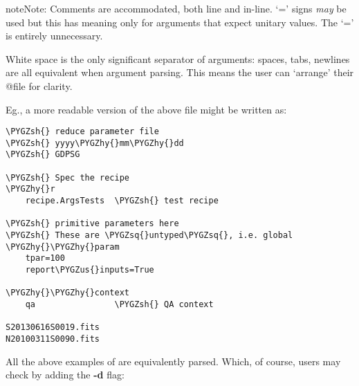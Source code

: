 \documentclass[letterpaper,10pt,english]{sphinxmanual}
\def\PYGZus{\char`\_}
\def\PYGZsh{\char`\#}
\def\PYGZhy{\char`\-}
\def\PYGZsq{\char`\'}
\begin{document}
\begin{notice}{note}{Note:}
Comments are accommodated, both line and in-line. `=' signs \emph{may} be
used but this has meaning only for arguments that expect unitary
values. The `=' is entirely unnecessary.

White space is the only significant separator of arguments: spaces,
tabs, newlines are all equivalent when argument parsing. This means
the user can `arrange' their @file for clarity.

Eg., a more readable version of the above file might be written as:

\begin{Verbatim}[commandchars=\\\{\}]
\PYGZsh{} reduce parameter file
\PYGZsh{} yyyy\PYGZhy{}mm\PYGZhy{}dd
\PYGZsh{} GDPSG

\PYGZsh{} Spec the recipe
\PYGZhy{}r
    recipe.ArgsTests  \PYGZsh{} test recipe

\PYGZsh{} primitive parameters here
\PYGZsh{} These are \PYGZsq{}untyped\PYGZsq{}, i.e. global
\PYGZhy{}\PYGZhy{}param
    tpar=100
    report\PYGZus{}inputs=True

\PYGZhy{}\PYGZhy{}context
    qa                \PYGZsh{} QA context

S20130616S0019.fits
N20100311S0090.fits
\end{Verbatim}
\end{notice}

All the above  examples of  are equivalently parsed. Which,
of course, users may check by adding the \textbf{-d} flag:
\end{document}
